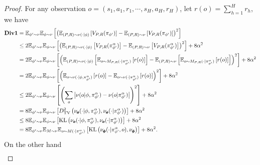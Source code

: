 \begin{proof}
For any observation $o  = (s_1, a_1, r_1, \cdots, s_H, a_H, r_H)$, let $r(o) = \sum_{h=1}^H r_h$, we have
\begin{align*}
    \textbf{Div1} &= \mathbb{E}_{\phi' \sim \nu}\mathbb{E}_{\phi \sim \nu}\left[\left(\mathbb{E}_{(P,R) \sim \nu(\cdot|\phi)}\left[V_{P,R}(\pi_{\phi'})\right] - \mathbb{E}_{(P,R) \sim \nu}\left[V_{P,R}(\pi_{\phi'})\right]\right)^2\right]
    \\&\le 2\mathbb{E}_{\phi' \sim \nu}\mathbb{E}_{\phi \sim \nu}\left[\left(\mathbb{E}_{(P,R) \sim \nu(\cdot|\phi)}\left[V_{P,R}(\pi_{\phi'}^\alpha)\right] - \mathbb{E}_{(P,R) \sim \nu}\left[V_{P,R}(\pi_{\phi'}^\alpha)\right]\right)^2\right] + 8\alpha^2
    \\&= 2\mathbb{E}_{\phi' \sim \nu}\mathbb{E}_{\phi \sim \nu}\left[\left(\mathbb{E}_{(P,R) \sim \nu(\cdot|\phi)}\left[\mathbb{E}_{o \sim M_{P,R}(\cdot|\pi_{\phi'}^\alpha)}\left[r(o)\right]\right] - \mathbb{E}_{(P,R) \sim \nu}\left[\mathbb{E}_{o \sim M_{P,R}(\cdot|\pi_{\phi'}^\alpha)}\left[r(o)\right]\right]\right)^2\right] + 8\alpha^2
    \\&= 2\mathbb{E}_{\phi' \sim \nu}\mathbb{E}_{\phi \sim \nu}\left[\left(\mathbb{E}_{o \sim \nu(\cdot|\phi, \pi_{\phi'}^\alpha)}\left[r(o)\right] - \mathbb{E}_{o \sim \nu(\cdot|\pi_{\phi'}^\alpha)}\left[r(o)\right] \right)^2\right] + 8\alpha^2
    \\&\le 2\mathbb{E}_{\phi' \sim \nu}\mathbb{E}_{\phi \sim \nu}\left[\left(\sum_{o}\left|\nu(o|\phi, \pi_{\phi'}^\alpha) - \nu(o|\pi_{\phi'}^\alpha) \right|\right)^2\right] + 8\alpha^2
    \\&= 8\mathbb{E}_{\phi' \sim \nu}\mathbb{E}_{\phi \sim \nu}\left[D_{\text{TV}}^2\left(\nu_{\pmb{o}}(\cdot|\phi, \pi_{\phi'}^\alpha), \nu_{\pmb{o}}(\cdot|\pi_{\phi'}^\alpha) \right)\right]  + 8\alpha^2
    \\&\le 8\mathbb{E}_{\phi' \sim \nu}\mathbb{E}_{\phi \sim \nu}\left[\text{KL}\left(\nu_{\pmb{o}}(\cdot|\phi, \pi_{\phi'}^\alpha), \nu_{\pmb{o}}(\cdot|\pi_{\phi'}^\alpha) \right)\right] + 8\alpha^2
    \\&= 8\mathbb{E}_{\phi' \sim \nu}\mathbb{E}_{M\sim \nu} \mathbb{E}_{o\sim M(\cdot|\pi^\alpha_{\phi'})}\left[\text{KL}\left(\nu_{\pmb{\phi}}(\cdot|\pi_{\phi'}^\alpha, o), \nu_{\pmb{\phi}} \right)\right] + 8\alpha^2.  
\end{align*}
On the other hand
\begin{align*}

\end{align*}
\end{proof}
